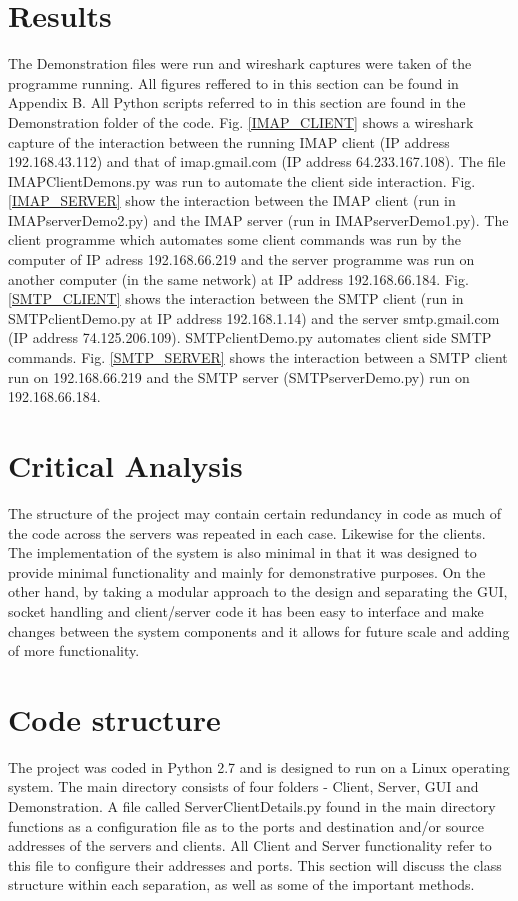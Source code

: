\documentclass[11pt]{article}
\begin{document}
\begin{multicols}{2}
\section{Results}
The Demonstration files were run and wireshark captures were taken of the programme running. All figures reffered to in this section can be found in Appendix B. All Python scripts referred to in this section are found in the Demonstration folder of the code. Fig. \ref{IMAP_CLIENT} shows a wireshark capture of the interaction between the running IMAP client (IP address 192.168.43.112) and that of imap.gmail.com (IP address 64.233.167.108). The file IMAPClientDemons.py was run to automate the client side interaction. Fig. \ref{IMAP_SERVER} show the interaction between the IMAP client (run in IMAPserverDemo\textunderscore 2.py) and the IMAP server (run in IMAPserverDemo\textunderscore 1.py). The client  programme which automates some client commands was run by the computer of IP adress 192.168.66.219 and the server programme was run on another computer (in the same network) at IP address 192.168.66.184. Fig. \ref{SMTP_CLIENT} shows the interaction between the SMTP client (run in SMTPclientDemo.py at IP address 192.168.1.14) and the server smtp.gmail.com (IP address 74.125.206.109). SMTPclientDemo.py automates client side SMTP commands. Fig. \ref{SMTP_SERVER} shows the interaction between a SMTP client run on 192.168.66.219 and the SMTP server (SMTPserverDemo.py) run on 192.168.66.184.
\section{Critical Analysis}
The structure of the project may contain certain redundancy in code as much of the code across the servers was repeated in each case. Likewise for the clients. The implementation of the system is also minimal in that it was designed to provide minimal functionality and mainly for demonstrative purposes. On the other hand, by taking a modular approach to the design and separating the GUI, socket handling and client/server code it has been easy to interface and make changes between the system components and it allows for future scale and adding of more functionality.
\section{Code structure}
The project was coded in Python 2.7 and is designed to run on a Linux operating system. The main directory consists of four folders - Client, Server, GUI and Demonstration. A file called ServerClientDetails.py found in the main directory functions as a configuration file as to the ports and destination and/or source addresses of the servers and clients. All Client and Server functionality refer to this file to configure their addresses and ports. This section will discuss the class structure within each separation, as well as some of the important methods.


\end{multicols}
\end{document}
